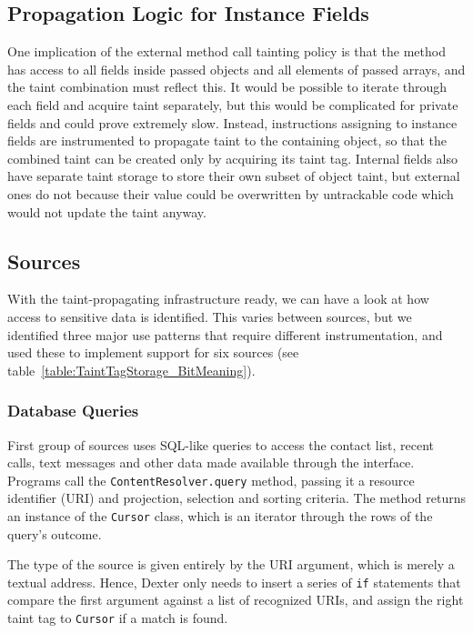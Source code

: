 \documentclass[12pt,twoside,notitlepage]{report}
\begin{document}
\subsection{Propagation Logic for Instance Fields}

One implication of the external method call tainting policy is that the method has access to all fields inside passed objects and all elements of passed arrays, and the taint combination must reflect this. It would be possible to iterate through each field and acquire taint separately, but this would be complicated for private fields and could prove extremely slow. Instead, instructions assigning to instance fields are instrumented to propagate taint to the containing object, so that the combined taint can be created only by acquiring its taint tag. Internal fields also have separate taint storage to store their own subset of object taint, but external ones do not because their value could be overwritten by untrackable code which would not update the taint anyway.

\subsection{Sources}

With the taint-propagating infrastructure ready, we can have a look at how access to sensitive data is identified. This varies between sources, but we identified three major use patterns that require different instrumentation, and used these to implement support for six sources (see table~\ref{table:TaintTagStorage_BitMeaning}).

\subsubsection{Database Queries}

First group of sources uses SQL-like queries to access the contact list, recent calls, text messages and other data made available through the interface. Programs call the \verb$ContentResolver.query$ method, passing it a resource identifier (URI) and projection, selection and sorting criteria. The method returns an instance of the \verb$Cursor$ class, which is an iterator through the rows of the query's outcome. 

The type of the source is given entirely by the URI argument, which is merely a textual address. Hence, Dexter only needs to insert a series of \verb$if$ statements that compare the first argument against a list of recognized URIs, and assign the right taint tag to \verb$Cursor$ if a match is found.
\end{document}
